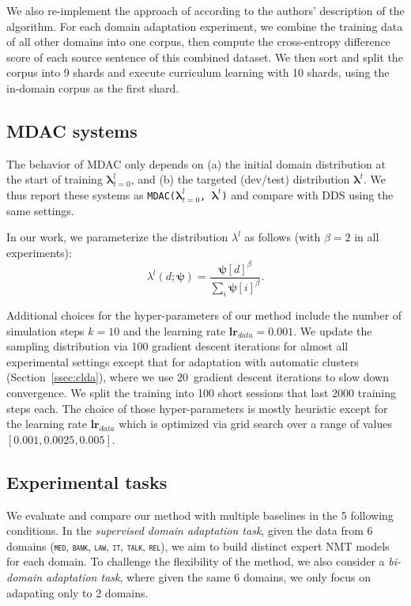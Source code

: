 \documentclass[11pt]{article}
\newcommand{\fyFuture}[1]{\done[FY]\Todo[FY:]{\textcolor{red}{#1}}}
\newcommand{\domain}[1]{\texttt{\textsc{#1}}}
\newcommand{\system}[1]{\texttt{{#1}}}
\newcommand{\vlambda}{\ensuremath{\boldsymbol\lambda}\xspace} %
\newcommand{\vpsi}{\ensuremath{\boldsymbol\psi}\xspace} %
\begin{document}
We also re-implement the approach of \citet{Zhang19curriculum} according to the authors' description of the algorithm. For each domain adaptation experiment, we combine the training data of all other domains into one corpus, then compute the cross-entropy difference score of each source sentence of this combined dataset. We then sort and split the corpus into 9 shards and execute curriculum learning with 10 shards, using the in-domain corpus as the first shard.

\subsection{MDAC systems} \label{ssec:dds-sys}
The behavior of MDAC only depends on (a) the initial domain distribution at the start of training $\vlambda^{l}_{t=0}$, and (b) the targeted (dev/test) distribution $\vlambda^{t}$. We thus report these systems as \system{MDAC($\vlambda^{l}_{t=0}$, $\vlambda^{t}$)} and compare with DDS using the same settings.

In our work, we parameterize the distribution $\lambda^l$ as follows (with $\beta=2$ in all experiments):\fyFuture{Explain why}
\begin{equation}
\lambda
^l(d;\vpsi) = \frac{\vpsi[d]^\beta}{\sum_i \vpsi[i]^\beta}. \nonumber
\end{equation}

Additional choices for the hyper-parameters of our method include the number of simulation steps $k=10$ and the learning rate $\mathbf{lr}_{data}=0.001$. We update the sampling distribution via 100 gradient descent iterations for almost all experimental settings except that for adaptation with automatic clusters (Section~\ref{ssec:clda}), where we use 20~gradient descent iterations to slow down convergence.\fyFuture{Why? computation?} We split the training into 100 short sessions that last 2000 training steps each. The choice of those hyper-parameters is mostly heuristic except for the learning rate $\mathbf{lr}_{data}$ which is optimized via grid search over a range of values $[0.001,0.0025,0.005]$.

\subsection{Experimental tasks}
We evaluate and compare our method with multiple baselines in the 5 following conditions.
In the \emph{supervised domain adaptation task}, given the data from 6 domains (\domain{med}, \domain{bank}, \domain{law}, \domain{it}, \domain{talk}, \domain{rel}), we aim to build distinct expert NMT models for each domain. To challenge the flexibility of the method, we also consider a \emph{bi-domain adaptation task}, where given the same 6 domains, we only focus on adapating only to 2 domains.
\end{document}
